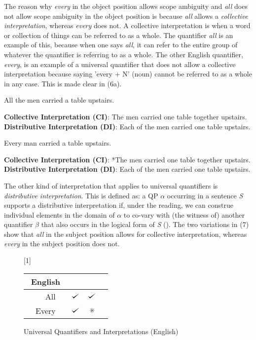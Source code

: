 \documentclass[english, 11pt]{article}
\newcommand{\dwork}{\text{\ding{83}}}
\def\checkmark{\tikz\fill[scale=0.4](0,.35) -- (.25,0) -- (1,.7) -- (.25,.15) -- cycle;}
\begin{document}
The reason why \emph{every} in the object position allows scope ambiguity and \emph{all} does not allow scope ambiguity in the object position is because \emph{all} allows a \emph{collective interpretation}, whereas \emph{every} does not. A collective interpretation is when a word or collection of things can be referred to as a whole. The quantifier \emph{all} is an example of this, because when one says \emph{all}, it can refer to the entire group of whatever the quantifier is referring to as a whole. The other English quantifier, \emph{every}, is an example of a universal quantifier that does not allow a collective interpretation because saying 'every + N' (noun) cannot be referred to as a whole in any case. This is made clear in (6a). 

\begin {exe}
	\ex 
		\begin {xlist}
			\ex All the men carried a table upstairs.
			\begin {xlist} 
				\ex \textbf{Collective Interpretation (CI)}: The men carried one table together upstairs.
				\ex \textbf{Distributive Interpretation (DI)}: Each of the men carried one table upstairs.
			\end {xlist}
			\ex Every man carried a table upstairs.
				\begin {xlist} 
					\ex \textbf{Collective Interpretation (CI)}: *The men carried one table together upstairs.
					\ex \textbf{Distributive Interpretation (DI)}: Each of the men carried one table upstairs.
				\end {xlist}
	\end {xlist}
\end {exe}
The other kind of interpretation that applies to universal quantifiers is \emph{distributive interpretation}. This is defined as: a QP $\alpha$ occurring in a sentence \emph{S} supports a distributive interpretation if, under the reading, we can construe individual elements in the domain of $\alpha$ to co-vary with (the witness of) another quantifier $\beta$ that also occurs in the logical form of \emph{S} (\cite{s3}). The two variations in (7) show that \emph{all} in the subject position allows for collective interpretation, whereas \emph{every} in the subject position does not.
\begin{figure}[h]
	\begin{center} \renewcommand*\arraystretch{1.2}
	\scalebox{1}[1]{\begin{tabular}[t]{|rrl||c|c|c|} \hline 
	\multicolumn{3}{|c||}{English} & \sc{Distributive} & \sc{Collective}  \\[0.5ex]
  	 	\hline & All 		& & $\checkmark$ & $\checkmark$ \\
		\hline & Every 	& & $\checkmark$ & $\dwork$ \\
   	 	\hline 
	\end{tabular}} \renewcommand*\arraystretch{1} \end{center}
	\vspace*{-5mm}
	\captionsetup{labelfont=bf}
	\caption[labelfont=bf]{Universal Quantifiers and Interpretations (English)}
\end{figure}
\end{document}
